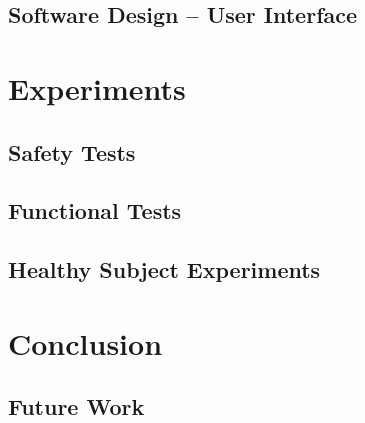 \documentclass[12pt]{report}
\begin{document}
	\section{Software Design -- User Interface} 
	
\chapter{Experiments}
	\section{Safety Tests}
	\section{Functional Tests}
	\section{Healthy Subject Experiments}
	
\chapter{Conclusion}
	\section{Future Work}
	
	


\end{document}
